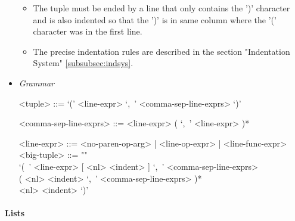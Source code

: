 \documentclass{article}
\begin{document}
\begin{itemize}
\begin{itemize}
\item
The tuple must be ended by a line that only contains the ')' character and is 
also indented so that the ')' is in same column where the '(' character was in
the first line.

\item
The precise indentation rules are described in the section
"Indentation System" \ref{subsubsec:indsys}.
\end{itemize}

\item \textit{Grammar}
\begin{grammar}
<tuple> ::= `(' <line-expr> `,\ ' <comma-sep-line-exprs> `)'

<comma-sep-line-exprs> ::= <line-expr> ( `,\ ' <line-expr> )*

<line-expr> ::= <no-paren-op-arg> | <line-op-expr> | <line-func-expr>
\\

<big-tuple> ::= ""\\
`(\ ' <line-expr> [ <nl> <indent> ] `,\ ' <comma-sep-line-exprs> \\
( <nl> <indent> `,\ ' <comma-sep-line-exprs> )* \\
<nl> <indent> `)' \\

\end{grammar}

\end{itemize}

\paragraph{Lists}
\end{document}
